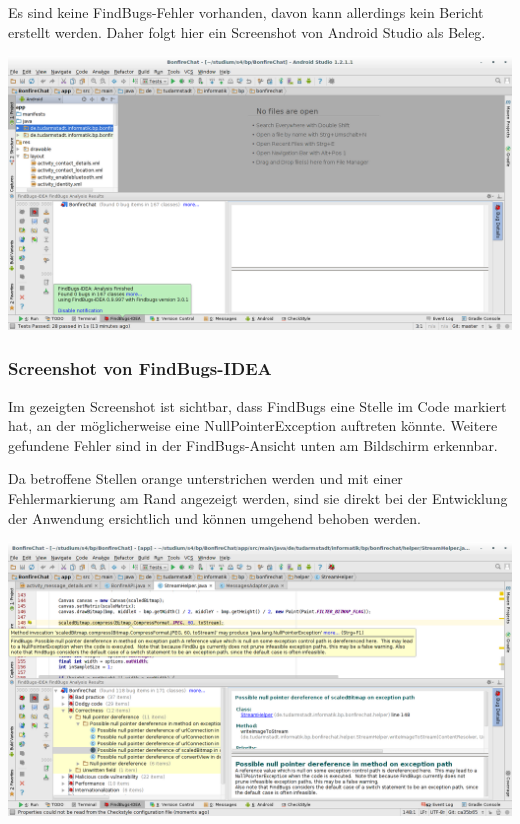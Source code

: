 Es sind keine FindBugs-Fehler vorhanden, davon kann allerdings kein Bericht erstellt werden. Daher folgt hier ein Screenshot von Android Studio als Beleg.

\includegraphics[width=17.5cm]{belege/findbugs/findbugs-no-warnings-screenshot.png}

\subsubsection{Screenshot von FindBugs-IDEA}

Im gezeigten Screenshot ist sichtbar, dass FindBugs eine Stelle im Code markiert hat, an der möglicherweise eine NullPointerException auftreten könnte. Weitere gefundene Fehler sind in der FindBugs-Ansicht unten am Bildschirm erkennbar.

Da betroffene Stellen orange unterstrichen werden und mit einer Fehlermarkierung am Rand angezeigt werden, sind sie direkt bei der Entwicklung der Anwendung ersichtlich und können umgehend behoben werden.

\includegraphics[width=17.5cm]{belege/findbugs/findbugs-idea-screenshot.png}

